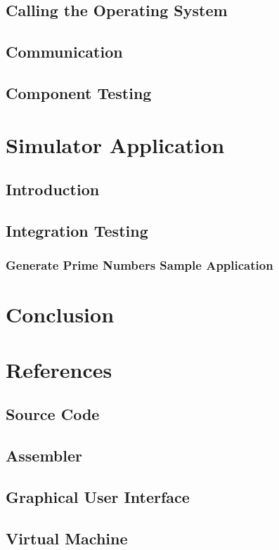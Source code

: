\documentclass[a4paper,11pt]{report}
\begin{document}
\section{Calling the Operating System}
\section{Communication}
\section{Component Testing}
\chapter{Simulator Application}
\section{Introduction}
\section{Integration Testing}
\subsection{Generate Prime Numbers Sample Application}
\chapter*{Conclusion}
\chapter*{References}
\begin{appendices}
\noappendicestocpagenum
\addappheadtotoc 
\chapter{Source Code}
\section{Assembler}
\section{Graphical User Interface}
\section{Virtual Machine}
\end{appendices}
\end{document}
